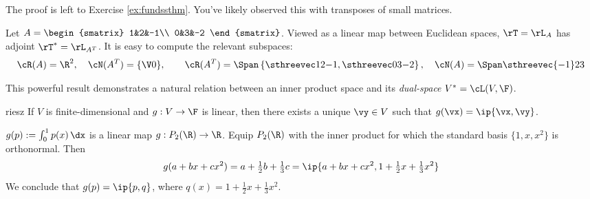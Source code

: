 The proof is left to Exercise \ref{ex:fundssthm}. You've likely observed this with transposes of small matrices.

\begin{example}{}{}
Let $A=\begin{smatrix}
1&2&-1\\
0&3&-2
\end{smatrix}$. Viewed as a linear map between Euclidean spaces, $\rT=\rL_A$ has adjoint $\rT^*=\rL_{A^T}$. It is easy to compute the relevant subspaces:
\begin{gather*}
\cR(A)=\R^2,\quad \cN(A^T)=\{\V0\},\qquad \cR(A^T)=\Span\left\{\sthreevec 12{-1},\sthreevec 03{-2}\right\},\quad \cN(A)=\Span\sthreevec{-1}23
\end{gather*}
\end{example}





This powerful result demonstrates a natural relation between an inner product space and its \emph{dual-space} $V^*=\cL(V,\F)$.


\begin{thm}{}{riesz}
If $V$ is finite-dimensional and $g:V\to\F$ is linear, then there exists a unique $\vy\in V$ such that $g(\vx)=\ip{\vx,\vy}$.
\end{thm}

\begin{example}{}{}
$g(p):=\int_0^1p(x)\,\dx$ is a linear map $g:P_2(\R)\to \R$. Equip $P_2(\R)$ with the inner product for which the standard basis $\{1,x,x^2\}$ is orthonormal. Then
\[g(a+bx+cx^2)=a+\tfrac 12b+\tfrac 13c=\ip{a+bx+cx^2,1+\tfrac 12x+\tfrac 13x^2}\]
We conclude that $g(p)=\ip{p,q}$, where $q(x)=1+\frac 12x+\frac 13x^2$.
\end{example}



